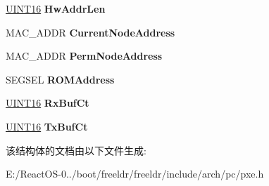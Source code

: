 \begin{DoxyCompactItemize}
\item 
\mbox{\label{structs___p_x_e_n_v___u_n_d_i___g_e_t___i_n_f_o_r_m_a_t_i_o_n_ab935736ea19407e03d06cc0075253290}} 
\hyperlink{_processor_bind_8h_a09f1a1fb2293e33483cc8d44aefb1eb1}{U\+I\+N\+T16} {\bfseries Hw\+Addr\+Len}
\item 
\mbox{\label{structs___p_x_e_n_v___u_n_d_i___g_e_t___i_n_f_o_r_m_a_t_i_o_n_a6f23aaaa156be425bd6078de0ac1cf86}} 
M\+A\+C\+\_\+\+A\+D\+DR {\bfseries Current\+Node\+Address}
\item 
\mbox{\label{structs___p_x_e_n_v___u_n_d_i___g_e_t___i_n_f_o_r_m_a_t_i_o_n_aacf978fd16ea25d99ba522b4493d2f92}} 
M\+A\+C\+\_\+\+A\+D\+DR {\bfseries Perm\+Node\+Address}
\item 
\mbox{\label{structs___p_x_e_n_v___u_n_d_i___g_e_t___i_n_f_o_r_m_a_t_i_o_n_a6ba4b82cd05aa734ea53808e613e1fc2}} 
S\+E\+G\+S\+EL {\bfseries R\+O\+M\+Address}
\item 
\mbox{\label{structs___p_x_e_n_v___u_n_d_i___g_e_t___i_n_f_o_r_m_a_t_i_o_n_a32d569325a56aa65198cd3a4899dbde7}} 
\hyperlink{_processor_bind_8h_a09f1a1fb2293e33483cc8d44aefb1eb1}{U\+I\+N\+T16} {\bfseries Rx\+Buf\+Ct}
\item 
\mbox{\label{structs___p_x_e_n_v___u_n_d_i___g_e_t___i_n_f_o_r_m_a_t_i_o_n_a98df0925ecb718319822b981741438ed}} 
\hyperlink{_processor_bind_8h_a09f1a1fb2293e33483cc8d44aefb1eb1}{U\+I\+N\+T16} {\bfseries Tx\+Buf\+Ct}
\end{DoxyCompactItemize}


该结构体的文档由以下文件生成\+:\begin{DoxyCompactItemize}
\item 
E\+:/\+React\+O\+S-\/0../boot/freeldr/freeldr/include/arch/pc/pxe.\+h\end{DoxyCompactItemize}

